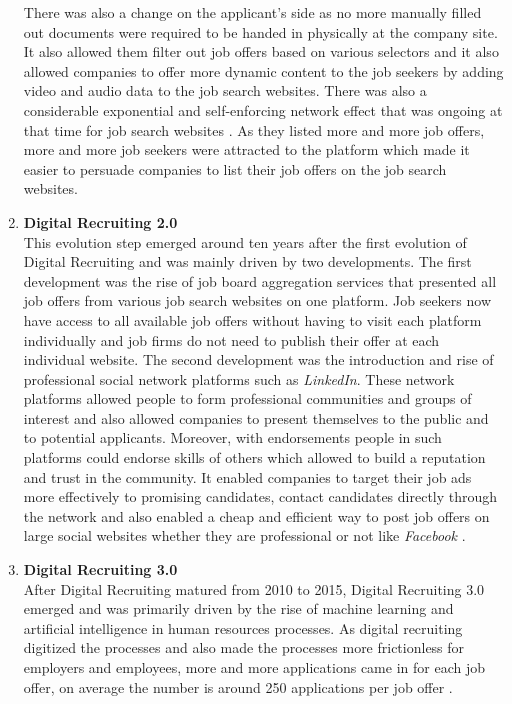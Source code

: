 \documentclass[draft,final]{thesisclass} %
\begin{document}
\begin{enumerate}
    There was also a change on the applicant's side as no more manually filled out documents were required to be handed in physically at the company site.
    It also allowed them filter out job offers based on various selectors and it also allowed companies to offer more dynamic content to the job seekers by adding video and audio data to the job search websites.
    There was also a considerable exponential and self-enforcing network effect that was ongoing at that time for job search websites \parencite[3]{ai_recruiting}.
    As they listed more and more job offers, more and more job seekers were attracted to the platform which made it easier to persuade companies to list their job offers on the job search websites.
    \item \textbf{Digital Recruiting 2.0} \label{digital_recruiting_2}\\
    This evolution step emerged around ten years after the first evolution of Digital Recruiting and was mainly driven by two developments.
    The first development was the rise of job board aggregation services that presented all job offers from various job search websites on one platform.
    Job seekers now have access to all available job offers without having to visit each platform individually and job firms do not need to publish their offer at each individual website.
    The second development was the introduction and rise of professional social network platforms such as \textit{LinkedIn}.
    These network platforms allowed people to form professional communities and groups of interest and also allowed companies to present themselves to the public and to potential applicants.
    Moreover, with endorsements people in such platforms could endorse skills of others which allowed to build a reputation and trust in the community.
    It enabled companies to target their job ads more effectively to promising candidates, contact candidates directly through the network and also enabled a cheap and efficient way to post job offers on large social websites whether they are professional or not like \textit{Facebook} \parencite[3]{ai_recruiting}.
    \item \textbf{Digital Recruiting 3.0} \label{digital_recruiting_3}\\
    After Digital Recruiting matured from 2010 to 2015, Digital Recruiting 3.0 emerged and was primarily driven by the rise of machine learning and artificial intelligence in human resources processes.
    As digital recruiting digitized the processes and also made the processes more frictionless for employers and employees, more and more applications came in for each job offer, on average the number is around 250 applications per job offer \parencite[4]{ai_recruiting}. 

\end{enumerate}
\end{document}
